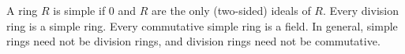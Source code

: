 A ring $R$ is simple if $0$ and $R$ are the only (two-sided) ideals of $R$. Every division ring is a simple ring. Every commutative simple ring is a field. In general, simple rings need not be division rings, and division rings need not be commutative.
